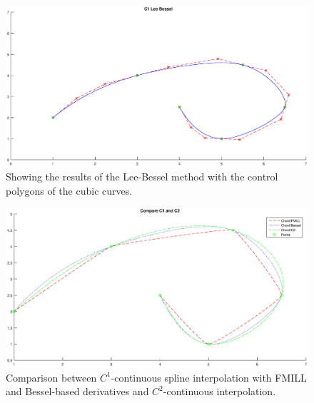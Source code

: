 \documentclass[12pt,a4paper]{article}
\begin{document}
\begin{figure}[hbtp]
\centering
\includegraphics[width=\textwidth]{C1-LeeBessel.eps}
\caption{Showing the results of the Lee-Bessel method with the control polygons of the cubic curves.}
\label{fig:C1-LeeBessel}
\end{figure}



\begin{figure}[hbtp]
\centering
\includegraphics[width=\textwidth]{C1vsC2.eps}
\caption{Comparison  between  $C^1$-continuous spline interpolation with FMILL and Bessel-based derivatives and $C^2$-continuous interpolation.}
\label{fig:C1vsC2}
\end{figure}
\end{document}
